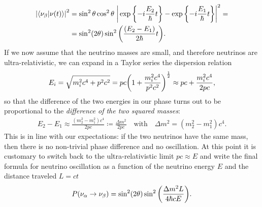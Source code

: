 \begin{align*}
  \abs{\braket{\nu_\beta}{\nu(t)}}^2 & = \sin^2\theta \cos^2\theta \;
    \abs{\,\exp\qty{-i\frac{E_2}{\hbar}t} - \exp\qty{-i\frac{E_1}{\hbar}t}}^2 = \\
  & = \sin^2(2\theta)\sin^2 \qty(\frac{(E_2 - E_1)}{2 \hbar}t).
\end{align*}
If we now assume that the neutrino masses are small, and therefore neutrinos are
ultra-relativistic, we can expand in a Taylor series the dispersion relation
\begin{align*}
  E_i = \sqrt{m_i^2 c^4 + p^2 c^2} =
  pc \qty(1 + \frac{m_i^2 c^4}{p^2c^2})^\frac{1}{2} \approx
  pc + \frac{m_i^2 c^4}{2pc},
\end{align*}
so that the difference of the two energies in our phase turns out to be
proportional to the \emph{difference of the two squared masses}:
\begin{align*}
  E_2 - E_1 \approx \frac{(m_2^2 - m_1^2) c^4}{2pc} \coloneq
  \frac{\Delta m^2}{2pc}
  \quad\text{with}\quad
  \Delta m^2 = (m_2^2 - m_1^2) c^4.
\end{align*}
This is in line with our expectations: if the two neutrinos have the same mass,
then there is no non-trivial phase difference and no oscillation. At this point
it is customary to switch back to the ultra-relativistic limit $pc \approx E$
and write the final formula for neutrino oscillation as a function of the
neutrino energy $E$ and
the distance traveled $L = ct$
\begin{align}\label{eq:nu_two_flavor_osc_prob}
  P(\nu_\alpha \rightarrow \nu_\beta) =
  \sin^2(2\theta)\sin^2 \qty(\frac{\Delta m^2 L}{4 \hbar c E}).
\end{align}

